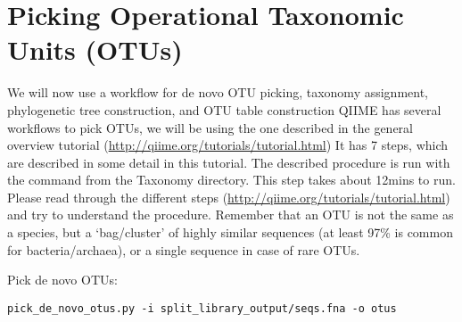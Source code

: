 \section{Picking Operational Taxonomic Units (OTUs)}
We will now use a workflow for de novo OTU picking, taxonomy assignment, phylogenetic tree construction, and OTU table construction QIIME has several workflows to pick OTUs, we will be using the one described in the general overview tutorial (\url{http://qiime.org/tutorials/tutorial.html}) It has 7 steps, which are described in some detail in this tutorial. 
The described procedure is run with the command from the Taxonomy directory. This step takes about 12mins to run. Please read through the different steps (\url{http://qiime.org/tutorials/tutorial.html}) and try to understand the procedure. Remember that an OTU is not the same as a species, but a ‘bag/cluster’ of highly similar sequences (at least 97\% is common for bacteria/archaea), or a single sequence in case of rare OTUs.

\begin{steps}
Pick de novo OTUs:

\begin{lstlisting}
pick_de_novo_otus.py -i split_library_output/seqs.fna -o otus   
\end{lstlisting}
\end{steps}

